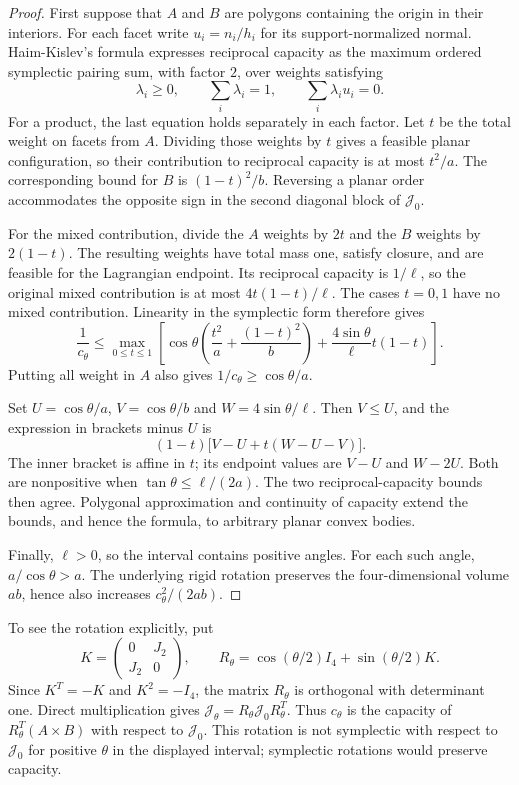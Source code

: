 \begin{proof}
First suppose that $A$ and $B$ are polygons containing the origin in their
interiors. For each facet write $u_i=n_i/h_i$ for its support-normalized
normal. Haim-Kislev's formula \cite[Theorem~1.1]{HK2017} expresses reciprocal
capacity as the maximum ordered symplectic pairing sum, with factor $2$,
over weights satisfying
\[
 \lambda_i\ge0,\qquad \sum_i\lambda_i=1,
 \qquad\sum_i\lambda_i u_i=0.
\]
For a product, the last equation holds separately in each factor. Let $t$
be the total weight on facets from $A$. Dividing those weights by $t$ gives
a feasible planar configuration, so their contribution to reciprocal
capacity is at most $t^2/a$. The corresponding bound for $B$ is
$(1-t)^2/b$. Reversing a planar order accommodates the opposite sign in
the second diagonal block of $\mathcal J_0$.

For the mixed contribution, divide the $A$ weights by $2t$ and the $B$
weights by $2(1-t)$. The resulting weights have total mass one, satisfy
closure, and are feasible for the Lagrangian endpoint. Its reciprocal
capacity is $1/\ell$, so the original mixed contribution is at most
$4t(1-t)/\ell$. The cases $t=0,1$ have no mixed contribution. Linearity in
the symplectic form therefore gives
\begin{equation}\label{eq:product-mass-bound}
 \frac1{c_\theta}\le
 \max_{0\le t\le1}\left[
  \cos\theta\left(\frac{t^2}{a}+\frac{(1-t)^2}{b}\right)
  +\frac{4\sin\theta}{\ell}t(1-t)\right].
\end{equation}
Putting all weight in $A$ also gives $1/c_\theta\ge\cos\theta/a$.

Set $U=\cos\theta/a$, $V=\cos\theta/b$ and
$W=4\sin\theta/\ell$. Then $V\le U$, and the expression in brackets minus
$U$ is
\[
 (1-t)\bigl[V-U+t(W-U-V)\bigr].
\]
The inner bracket is affine in $t$; its endpoint values are $V-U$ and
$W-2U$. Both are nonpositive when
$\tan\theta\le\ell/(2a)$. The two reciprocal-capacity bounds then agree.
Polygonal approximation and continuity of capacity extend the bounds,
and hence the formula, to arbitrary planar convex bodies.

Finally, $\ell>0$, so the interval contains positive angles. For each such
angle, $a/\cos\theta>a$. The underlying rigid rotation preserves the
four-dimensional volume $ab$, hence also increases $c_\theta^2/(2ab)$.
\end{proof}

To see the rotation explicitly, put
\[
 K=\begin{pmatrix}0&J_2\\J_2&0\end{pmatrix},\qquad
 R_\theta=\cos(\theta/2)I_4+\sin(\theta/2)K.
\]
Since $K^T=-K$ and $K^2=-I_4$, the matrix $R_\theta$ is orthogonal with
determinant one. Direct multiplication gives
$\mathcal J_\theta=R_\theta \mathcal J_0R_\theta^T$. Thus $c_\theta$ is the capacity of
$R_\theta^T(A\times B)$ with respect to $\mathcal J_0$. This rotation is not
symplectic with respect to $\mathcal J_0$ for positive $\theta$ in the displayed
interval; symplectic rotations would preserve capacity.

